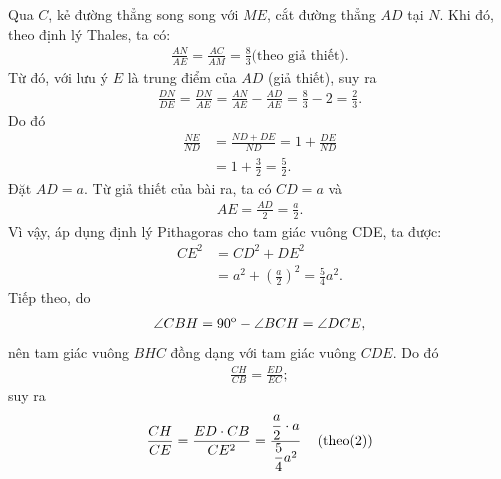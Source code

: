 \begin{multicols}{2}
\begin{figure}[H]
		\vspace*{-10pt}
	\end{figure}
	Qua $C$, kẻ đường thẳng song song với $ME$, cắt đường thẳng $AD$ tại $N$.
	\vskip 0.05cm
	Khi đó, theo định lý Thales, ta có:
	\begin{align*}
		\frac{{AN}}{{AE}} = \frac{{AC}}{{AM}} = \frac{8}{3} \text{(theo giả thiết).}
	\end{align*}
	Từ đó, với lưu ý $E$ là trung điểm của $AD$ (giả thiết), suy ra
	\begin{align*}
		\frac{{DN}}{{DE}} = \frac{{DN}}{{AE}} = \frac{{AN}}{{AE}} - \frac{{AD}}{{AE}} = \frac{8}{3} - 2 = \frac{2}{3}.
	\end{align*}
	Do đó
	\begin{align*}
		\frac{{NE}}{{ND}} &= \frac{{ND + DE}}{{ND}} = 1 + \frac{{DE}}{{ND}} \\
		&= 1 + \frac{3}{2} = \frac{5}{2}. \tag{$1$}
	\end{align*}
	Đặt $AD = a$. Từ giả thiết của bài ra, ta có $CD = a$ và
	\begin{align*}
		AE = \frac{{AD}}{2} = \frac{a}{2}.
	\end{align*}
	Vì vậy, áp dụng định lý Pithagoras cho tam giác vuông CDE, ta được:
	\begin{align*}
		C{E^2} &= C{D^2} + D{E^2} \\
		&= {a^2} + {\left( {\frac{a}{2}} \right)^2} = \frac{5}{4}{a^2}. \tag{$2$}
	\end{align*}
	Tiếp theo, do
	\begin{align*}
		\angle CBH = {90^{\rm{o}}} - \angle BCH = \angle DCE,
	\end{align*}
	nên tam giác vuông $BHC$ đồng dạng với tam giác vuông $CDE$. Do đó
	\begin{align*}
		\frac{{CH}}{{CB}} = \frac{{ED}}{{EC}};
	\end{align*}
	suy ra
	\begin{align*}
			\frac{{CH}}{{CE}} = \frac{{ED \cdot CB}}{{C{E^2}}} = \frac{{\dfrac{a}{2} \cdot a}}{{\dfrac{5}{4}{a^2}}}\quad\left( {{\rm{theo}}(2)} \right)\\

\end{align*}
\end{multicols}
